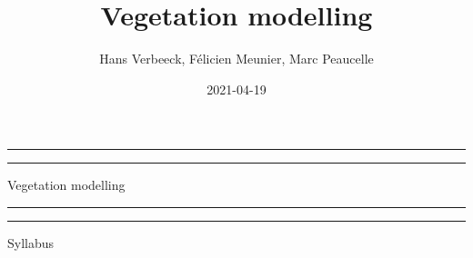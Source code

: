 \documentclass[12pt,oneside]{book}
\title{Vegetation modelling}
\author{Hans Verbeeck, Félicien Meunier, Marc Peaucelle}
\date{2021-04-19}
\begin{document}
\maketitle

\newcommand{\plogo}{\fbox{$\mathcal{PL}$}} %
\frontmatter


\begin{titlepage} %

	\centering %
	
	\scshape %
	
	\vspace*{\baselineskip} %
	
	
	\vspace{12\baselineskip}
	
	\rule{\textwidth}{1.6pt}\vspace*{-\baselineskip}\vspace*{2pt} %
	\rule{\textwidth}{0.4pt} %
	
	\vspace{0.75\baselineskip} %
	
	{\LARGE Vegetation modelling\\} %
	
	\vspace{0.75\baselineskip} %
	
	\rule{\textwidth}{0.4pt}\vspace*{-\baselineskip}\vspace{3.2pt} %
	\rule{\textwidth}{1.6pt} %
	
	\vspace{2\baselineskip} %
	
	
	Syllabus %
	
	\vspace*{3\baselineskip} %
	
	

\end{titlepage}
\end{document}
